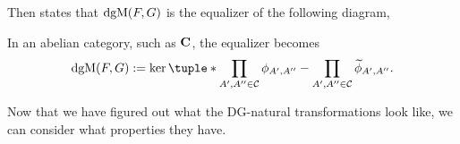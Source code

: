 \begin{remark}
    Then \cite[Proposition 6.3.1]{Borceux_1994} states that \( \operatorname{dgM}(F, G) \) is the equalizer of the following diagram,
    \begin{center}
    \end{center}

    In an abelian category, such as \( \operatorname{\mathbf{C}} \), the equalizer becomes
    \[
        \dgM(F, G) := \ker \tuple*{\prod\limits_{A', A'' \in \Cc} \phi_{A', A''} - \prod\limits_{A', A'' \in \Cc} \widetilde{\phi}_{A', A''}}.
    \]
\end{remark}

Now that we have figured out what the DG-natural transformations look like, we can consider what properties they have.


